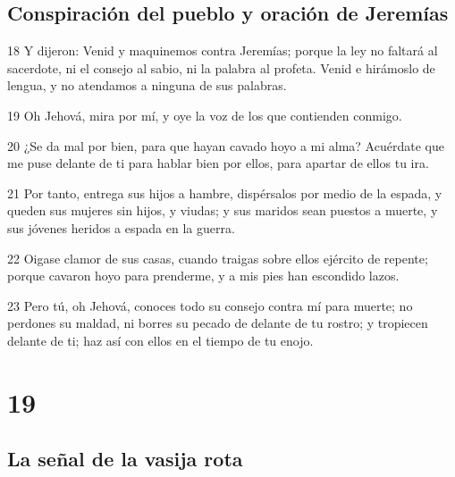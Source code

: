 \section*{Conspiración del pueblo y oración de Jeremías}

\par 18 Y dijeron: Venid y maquinemos contra Jeremías; porque la ley no faltará al sacerdote, ni el consejo al sabio, ni la palabra al profeta. Venid e hirámoslo de lengua, y no atendamos a ninguna de sus palabras.
\par 19 Oh Jehová, mira por mí, y oye la voz de los que contienden conmigo.
\par 20 ¿Se da mal por bien, para que hayan cavado hoyo a mi alma? Acuérdate que me puse delante de ti para hablar bien por ellos, para apartar de ellos tu ira.
\par 21 Por tanto, entrega sus hijos a hambre, dispérsalos por medio de la espada, y queden sus mujeres sin hijos, y viudas; y sus maridos sean puestos a muerte, y sus jóvenes heridos a espada en la guerra.
\par 22 Oigase clamor de sus casas, cuando traigas sobre ellos ejército de repente; porque cavaron hoyo para prenderme, y a mis pies han escondido lazos.
\par 23 Pero tú, oh Jehová, conoces todo su consejo contra mí para muerte; no perdones su maldad, ni borres su pecado de delante de tu rostro; y tropiecen delante de ti; haz así con ellos en el tiempo de tu enojo.

\chapter{19}

\section*{La señal de la vasija rota}

